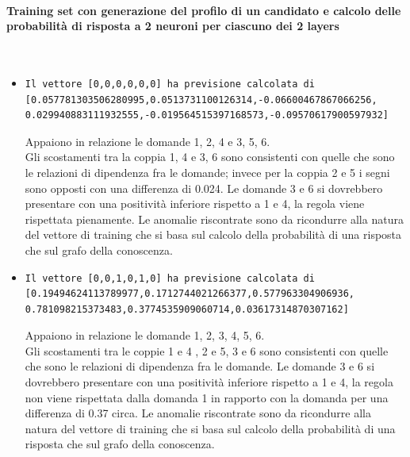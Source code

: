 \paragraph{Training set con generazione del profilo di un candidato e calcolo delle probabilit\`a di risposta a 2 neuroni per ciascuno dei 2 layers}\mbox{}
\label{Training set con generazione del profilo di un candidato e calcolo delle probabilita di risposta a 2 neuroni per ciascuno dei 2 layers}
\\
\noindent
\begin{itemize}
\item \begin{verbatim}Il vettore [0,0,0,0,0,0] ha previsione calcolata di
[0.057781303506280995,0.0513731100126314,-0.06600467867066256,
0.029940883111932555,-0.019564515397168573,-0.09570617900597932]
\end{verbatim}
Appaiono in relazione le domande 1, 2, 4 e 3, 5, 6.\\
Gli scostamenti tra la coppia 1, 4 e 3, 6 sono consistenti con  quelle che sono le relazioni di dipendenza fra le domande; invece per la coppia 2 e 5 i segni sono opposti con una differenza di 0.024.
Le domande 3 e 6 si dovrebbero presentare con una positivit\`a inferiore rispetto a 1 e 4, la regola viene rispettata pienamente. Le anomalie riscontrate sono da ricondurre alla natura del vettore di training che si basa sul calcolo della probabilit\`a di una risposta che sul grafo della conoscenza.

\item \begin{verbatim}Il vettore [0,0,1,0,1,0] ha previsione calcolata di
[0.19494624113789977,0.1712744021266377,0.577963304906936,
0.781098215373483,0.3774535909060714,0.03617314870307162]
\end{verbatim}
Appaiono in relazione le domande 1, 2, 3, 4, 5, 6.\\
Gli scostamenti tra le coppie 1 e 4 , 2 e 5, 3 e 6 sono consistenti con quelle che sono le relazioni di dipendenza fra le domande.
Le domande 3 e 6 si dovrebbero presentare con una positivit\`a inferiore rispetto a 1 e 4, la regola non viene rispettata dalla domanda 1 in rapporto con la domanda per una differenza di 0.37 circa.
Le anomalie riscontrate sono da ricondurre alla natura del vettore di training che si basa sul calcolo della probabilit\`a di una risposta che sul grafo della conoscenza.


\end{itemize}
